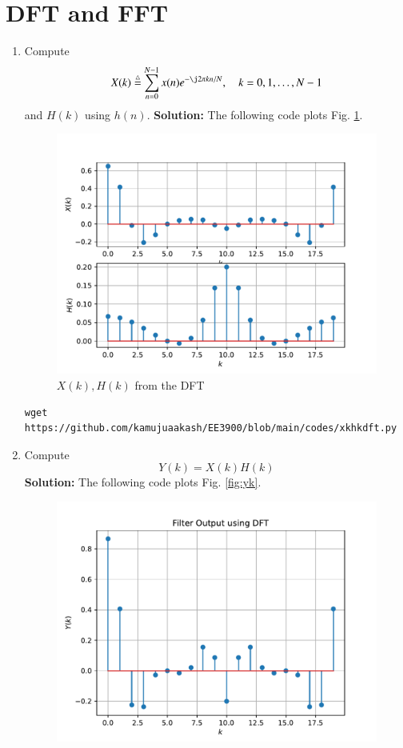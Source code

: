 \documentclass[journal,12pt,twocolumn]{IEEEtran}
\newcommand{\solution}{\noindent \textbf{Solution: }}
\numberwithin{equation}{section}
\renewcommand\thesection{\arabic{section}}
\newcommand{\define}{\stackrel{\triangle}{=}}
\begin{document}
\section{DFT and FFT}
\begin{enumerate}[label=\thesection.\arabic*]
\item
Compute
\begin{equation}
X(k) \define \sum _{n=0}^{N-1}x(n) e^{-\j2\pi kn/N}, \quad k = 0,1,\dots, N-1
\end{equation}
and $H(k)$ using $h(n)$.
\solution The following code plots Fig. \ref{fig:xkhk}. 
\begin{figure}[!ht]
\centering
\includegraphics[width=\columnwidth]{./figs/xkhk}
\caption{$X(k) ,H(k)$ from the DFT}
\label{fig:xkhk}
\end{figure}
\begin{lstlisting}
wget https://github.com/kamujuaakash/EE3900/blob/main/codes/xkhkdft.py
\end{lstlisting}
\item Compute 
\begin{equation}
Y(k) = X(k)H(k)
\end{equation}
\solution The following code plots Fig. \ref{fig:yk}. 
\begin{figure}[!ht]
\centering
\includegraphics[width=\columnwidth]{./figs/yk}

\end{figure}
\end{enumerate}
\end{document}
